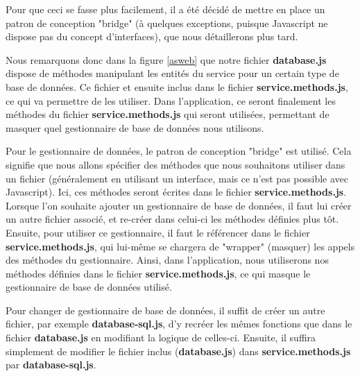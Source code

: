     Pour que ceci se fasse plus facilement, il a été décidé de mettre en place un patron de conception "bridge" (à quelques exceptions, puisque Javascript ne dispose pas du concept d'interfaces), que nous détaillerons plus tard.

    Nous remarquons donc dans la figure \ref{asweb} que notre fichier \textbf{database.js} dispose de méthodes manipulant les entités du service pour un certain type de base de données. Ce fichier et ensuite inclus dans le fichier \textbf{service.methods.js}, ce qui va permettre de les utiliser. Dans l'application, ce seront finalement les méthodes du fichier \textbf{service.methods.js} qui seront utilisées, permettant de masquer quel gestionnaire de base de données nous utilisons.
    
    Pour le gestionnaire de données, le patron de conception "bridge" est utilisé. Cela signifie que nous allons spécifier des méthodes que nous souhaitons utiliser dans un fichier (généralement en utilisant un interface, mais ce n'est pas possible avec Javascript). Ici, ces méthodes seront écrites dans le fichier \textbf{service.methods.js}. Lorsque l'on souhaite ajouter un gestionnaire de base de données, il faut lui créer un autre fichier associé, et re-créer dans celui-ci les méthodes définies plus tôt.
    Ensuite, pour utiliser ce gestionnaire, il faut le référencer dans le fichier \textbf{service.methods.js}, qui lui-même se chargera de "wrapper" (masquer) les appels des méthodes du gestionnaire. Ainsi, dans l'application, nous utiliserons nos méthodes définies dans le fichier \textbf{service.methods.js}, ce qui masque le gestionnaire de base de données utilisé.

    Pour changer de gestionnaire de base de données, il suffit de créer un autre fichier, par exemple \textbf{database-sql.js}, d'y recréer les mêmes fonctions que dans le fichier \textbf{database.js} en modifiant la logique de celles-ci. Ensuite, il suffira simplement de modifier le fichier inclus (\textbf{database.js}) dans \textbf{service.methods.js} par \textbf{database-sql.js}.

